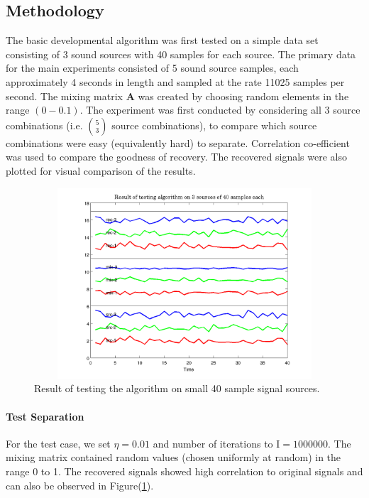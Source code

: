 \documentclass[11pt]{article}
\begin{document}
\subsection{Methodology}
The basic developmental algorithm was first tested on a simple data set consisting of 3 sound sources with 40 samples for each source. 
The primary data for the main experiments consisted of 5 sound source samples, each approximately 4 seconds in length and sampled at the rate 11025 samples per second. The mixing matrix \textbf{A} was created by choosing random elements in the range $(0 - 0.1)$. The experiment was first conducted by considering all 3 source combinations (i.e. $5 \choose 3$ source combinations), to compare which source combinations were easy (equivalently hard) to separate. Correlation co-efficient was used to compare the goodness of recovery. The recovered signals were also plotted for visual comparison of the results.
\begin{figure}[hb!]
\begin{center}
	\includegraphics[width=16.0cm, height=7.1cm]{../plots/icaTestCheckImage.png}
\end{center}
\vspace{-1.0cm}
\caption{Result of testing the algorithm on small 40 sample signal sources.}\label{fig:test1}
\end{figure}

\paragraph{Test Separation} 
For the test case, we set $\eta = 0.01$ and number of iterations to I$ = 1000000$. The mixing matrix contained random values (chosen uniformly at random) in the range 0 to 1. The recovered signals showed high correlation to original signals and can also be observed in Figure(\ref{fig:test1}).
\end{document}

